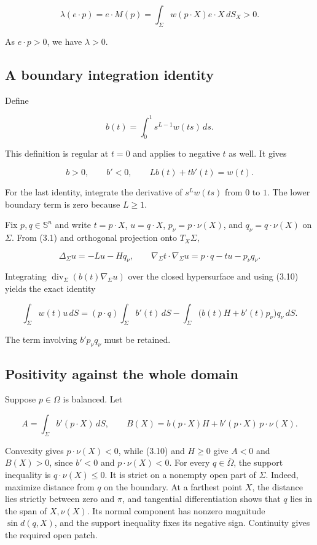 \documentclass[11pt]{article}
\begin{document}
\[
\lambda(e\cdot p)=e\cdot M(p)
=\int_\Sigma w(p\cdot X)e\cdot X\,dS_X>0.
\tag{3.8}
\]

As \(e\cdot p>0\), we have \(\lambda>0\).

\subsection{A boundary integration
identity}\label{a-boundary-integration-identity}

Define

\[
b(t)=\int_0^1s^{L-1}w(ts)\,ds.
\tag{3.9}
\]

This definition is regular at \(t=0\) and applies to negative \(t\) as
well. It gives

\[
b>0,\qquad b'<0,\qquad Lb(t)+tb'(t)=w(t).
\tag{3.10}
\]

For the last identity, integrate the derivative of \(s^Lw(ts)\) from
\(0\) to \(1\). The lower boundary term is zero because \(L\geq1\).

Fix \(p,q\in\mathbb S^n\) and write \(t=p\cdot X\), \(u=q\cdot X\),
\(p_\nu=p\cdot\nu(X)\), and \(q_\nu=q\cdot\nu(X)\) on \(\Sigma\). From
(3.1) and orthogonal projection onto \(T_X\Sigma\),

\[
\Delta_\Sigma u=-Lu-Hq_\nu,\qquad
\nabla_\Sigma t\cdot\nabla_\Sigma u=p\cdot q-tu-p_\nu q_\nu.
\tag{3.11}
\]

Integrating \(\operatorname{div}_\Sigma(b(t)\nabla_\Sigma u)\) over the
closed hypersurface and using (3.10) yields the exact identity

\[
\int_\Sigma w(t)u\,dS
=(p\cdot q)\int_\Sigma b'(t)\,dS
-\int_\Sigma\bigl(b(t)H+b'(t)p_\nu\bigr)q_\nu\,dS.
\tag{3.12}
\]

The term involving \(b'p_\nu q_\nu\) must be retained.

\subsection{Positivity against the whole
domain}\label{positivity-against-the-whole-domain}

Suppose \(p\in\Omega\) is balanced. Let

\[
A=\int_\Sigma b'(p\cdot X)\,dS,\qquad
B(X)=b(p\cdot X)H+b'(p\cdot X)\,p\cdot\nu(X).
\tag{3.13}
\]

Convexity gives \(p\cdot\nu(X)<0\), while (3.10) and \(H\geq0\) give
\(A<0\) and \(B(X)>0\), since \(b'<0\) and \(p\cdot\nu(X)<0\). For every
\(q\in\overline\Omega\), the support inequality is
\(q\cdot\nu(X)\leq0\). It is strict on a nonempty open part of
\(\Sigma\). Indeed, maximize distance from \(q\) on the boundary. At a
farthest point \(X\), the distance lies strictly between zero and
\(\pi\), and tangential differentiation shows that \(q\) lies in the
span of \(X,\nu(X)\). Its normal component has nonzero magnitude
\(\sin d(q,X)\), and the support inequality fixes its negative sign.
Continuity gives the required open patch.
\end{document}
